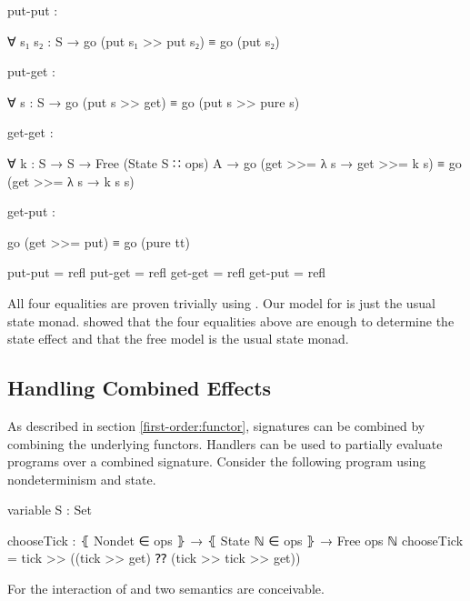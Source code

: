 \begin{code}[hide]
  put-put :
\end{code}
\begin{code}
    ∀ {s₁ s₂ : S} → go (put s₁ >> put s₂) ≡ go (put s₂)
\end{code}
\begin{code}[hide]
  put-get :
\end{code}
\begin{code}
    ∀ {s : S} → go (put s >> get) ≡ go (put s >> pure s)
\end{code}
\begin{code}[hide]
  get-get :
\end{code}
\begin{code}
    ∀ {k : S → S → Free (State S ∷ ops) A} →
      go (get >>= λ s → get >>= k s) ≡ go (get >>= λ s → k s s)
\end{code}
\begin{code}[hide]
  get-put :
\end{code}
\begin{code}
    go (get >>= put) ≡ go (pure tt)
\end{code}
\begin{code}[hide]
  put-put = refl
  put-get = refl
  get-get = refl
  get-put = refl
\end{code}
All four equalities are proven trivially using .
Our model for  is just the usual state monad.
\textcite{DBLP:conf/fossacs/PlotkinP02} showed that the four equalities above
are enough to determine the state effect and that the free model is the usual
state monad.


\subsection{Handling Combined Effects}
\label{first-order:combined-effects}

As described in section \ref{first-order:functor}, signatures can be combined by
combining the underlying functors.
Handlers can be used to partially evaluate programs over a combined signature.
Consider the following program using nondeterminism and state.

\begin{code}[hide]
variable
  S : Set
\end{code}
\begin{code}
chooseTick : ⦃ Nondet ∈ ops ⦄ → ⦃ State ℕ ∈ ops ⦄ → Free ops ℕ
chooseTick = tick >> ((tick >> get) ⁇ (tick >> tick >> get))
\end{code}
For the interaction of  and  two
semantics are conceivable.
